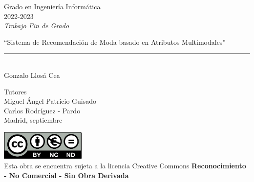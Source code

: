 \documentclass[12pt]{report} %
\begin{document}
	
\begin{titlepage}
	\begin{sffamily}
	\color{azulUC3M}
	\begin{center}
		\begin{figure}[H] %
		\end{figure}
		\vspace{2.5cm}
		\begin{Large}
			Grado en Ingeniería Informática\\			
			2022-2023\\
			\vspace{2cm}		
			\textsl{Trabajo Fin de Grado}
			\bigskip
			
		\end{Large}
		 	{\Huge ``Sistema de Recomendación de Moda basado en Atributos Multimodales''}\\
		 	\vspace*{0.5cm}
	 		\rule{10.5cm}{0.1mm}\\
			\vspace*{0.9cm}
			{\LARGE Gonzalo Llosá Cea}\\ 
			\vspace*{1cm}
		\begin{Large}
			Tutores\\
			Miguel Ángel Patricio Guisado\\
			Carlos Rodríguez - Pardo\\
			Madrid, septiembre\\
		\end{Large}
	\end{center}
	\vfill
	\color{black}
	\includegraphics[width=4.2cm]{imagenes/creativecommons.png}\\ %
	Esta obra se encuentra sujeta a la licencia Creative Commons \textbf{Reconocimiento - No Comercial - Sin Obra Derivada}
	\end{sffamily}
\end{titlepage}
\end{document}
